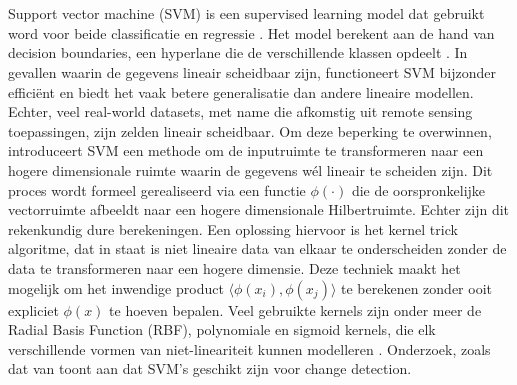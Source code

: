 
\section{}%
\label{sec:support-vector-machines}

Support vector machine (SVM) is een supervised learning model dat gebruikt word voor beide classificatie en regressie \autocite{Hearst1998}.
Het model berekent aan de hand van decision boundaries, een hyperlane die de verschillende klassen opdeelt \autocite{Hearst1998}. 
In gevallen waarin de gegevens lineair scheidbaar zijn, functioneert SVM bijzonder efficiënt en biedt het vaak betere generalisatie dan 
andere lineaire modellen. 
\newline
\newline
Echter, veel real-world datasets, met name die afkomstig uit remote sensing toepassingen, zijn zelden lineair scheidbaar. 
Om deze beperking te overwinnen, introduceert SVM een methode om de inputruimte te transformeren naar een hogere dimensionale ruimte waarin 
de gegevens wél lineair te scheiden zijn. Dit proces wordt formeel gerealiseerd via een functie $\phi(\cdot)$ die de oorspronkelijke 
vectorruimte afbeeldt naar een hogere dimensionale Hilbertruimte. Echter zijn dit rekenkundig dure berekeningen.
\newline
\newline
Een oplossing hiervoor is het kernel trick algoritme, dat in staat is niet lineaire data van elkaar te onderscheiden zonder de data te 
transformeren naar een hogere dimensie. Deze techniek maakt het mogelijk om het inwendige product $\langle \phi(x_i), \phi(x_j) \rangle$ 
te berekenen zonder ooit expliciet $\phi(x)$ te hoeven bepalen. 
Veel gebruikte kernels zijn onder meer de Radial Basis Function (RBF), polynomiale en sigmoid kernels, die elk verschillende vormen van 
niet-lineariteit kunnen modelleren \autocite{cristianini2002support}.
\newline
Onderzoek, zoals dat van \textcite{Habib_2009} toont aan dat SVM's geschikt zijn voor change detection.

